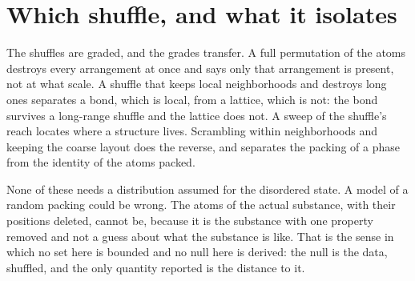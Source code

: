 \section{Which shuffle, and what it isolates}

The shuffles are graded, and the grades transfer. A full permutation of the atoms destroys every
arrangement at once and says only that arrangement is present, not at what scale. A shuffle that
keeps local neighborhoods and destroys long ones separates a bond, which is local, from a lattice,
which is not: the bond survives a long-range shuffle and the lattice does not. A sweep of the
shuffle's reach locates where a structure lives. Scrambling within neighborhoods and keeping the
coarse layout does the reverse, and separates the packing of a phase from the identity of the atoms
packed.

None of these needs a distribution assumed for the disordered state. A model of a random packing
could be wrong. The atoms of the actual substance, with their positions deleted, cannot be, because
it is the substance with one property removed and not a guess about what the substance is like.
That is the sense in which no set here is bounded and no null here is derived: the null is the data,
shuffled, and the only quantity reported is the distance to it.
